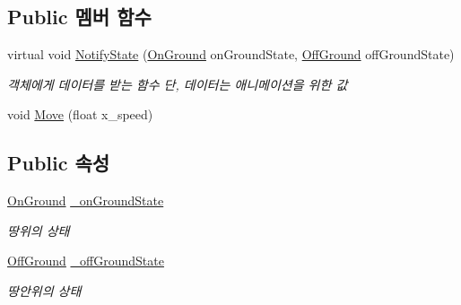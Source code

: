 \subsection*{Public 멤버 함수}
\begin{DoxyCompactItemize}
\item 
virtual void \mbox{\hyperlink{class_state_a989a27f9b711812d983344ee381da419}{Notify\+State}} (\mbox{\hyperlink{class_state_ab9eb1c1d81f1903b8486d1275e78b68e}{On\+Ground}} on\+Ground\+State, \mbox{\hyperlink{class_state_a7d945e793324c017a973205564cf1a56}{Off\+Ground}} off\+Ground\+State)
\begin{DoxyCompactList}\small\item\em 객체에게 데이터를 받는 함수 단, 데이터는 애니메이션을 위한 값 \end{DoxyCompactList}\item 
void \mbox{\hyperlink{class_state_a4424d0f582fe05b9dc7cec2a0a7c735a}{Move}} (float x\+\_\+speed)
\end{DoxyCompactItemize}
\subsection*{Public 속성}
\begin{DoxyCompactItemize}
\item 
\mbox{\hyperlink{class_state_ab9eb1c1d81f1903b8486d1275e78b68e}{On\+Ground}} \mbox{\hyperlink{class_state_ab3170df5e58f541f39edff3c1278d443}{\+\_\+on\+Ground\+State}}
\begin{DoxyCompactList}\small\item\em 땅위의 상태 \end{DoxyCompactList}\item 
\mbox{\hyperlink{class_state_a7d945e793324c017a973205564cf1a56}{Off\+Ground}} \mbox{\hyperlink{class_state_ad421039bfc35b46969f174c9617ab786}{\+\_\+off\+Ground\+State}}
\begin{DoxyCompactList}\small\item\em 땅안위의 상태 \end{DoxyCompactList}\end{DoxyCompactItemize}
